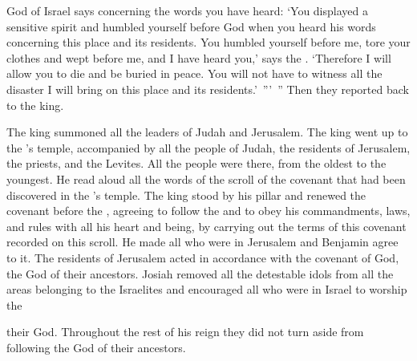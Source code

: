 {{}
God
of Israel
says concerning the words
you have
heard:
‘You displayed a sensitive
spirit and humbled
yourself before
God
when you heard
his words
concerning
this
place
and its residents.
You humbled
yourself before
me, tore
your clothes
and wept
before
me, and I
have heard
you,’ says
the {}.
‘Therefore I will allow
you to
die
and be buried
in peace.
You will not
have to
witness
all
the disaster
I
will bring
on
this
place
and its residents.’ ”’ ” Then they reported back
to the king.
\par }{\PP {}The king
summoned
all
the leaders
of Judah
and Jerusalem.
The king
went up
to the
{}’s
temple,
accompanied by all
the people
of Judah,
the residents
of Jerusalem,
the priests,
and the Levites.
All
the people
were there, from the oldest
to
the youngest.
He read
aloud
all
the words
of the scroll
of the covenant
that had been discovered
in the
{}’s
temple.
The king
stood
by
his pillar and renewed
the
covenant
before
the {}, agreeing
to follow
the {}
and to obey
his commandments,
laws,
and rules
with all
his heart
and being,
by carrying out
the
terms
of this covenant
recorded
on
this
scroll.
He made
all
who were
in Jerusalem
and Benjamin
agree to it.
The residents
of Jerusalem
acted
in accordance with the covenant
of God,
the God
of their ancestors.
Josiah
removed
all
the detestable
idols from all
the areas
belonging to the
Israelites
and encouraged
all
who were
in Israel
to worship
the

{}
their God.
Throughout
the rest
of his reign
they did not
turn aside
from following
the {}
God
of their ancestors.

\par }
